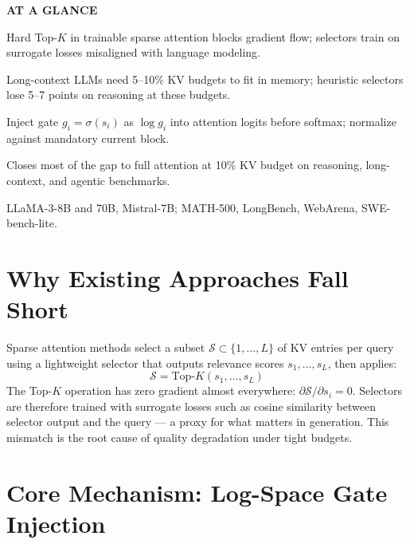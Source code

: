 \documentclass[10pt,twocolumn]{article}
\begin{document}
\begin{mdframed}[backgroundcolor=boxgray,linecolor=rulered,linewidth=1pt,
    innerleftmargin=6pt,innerrightmargin=6pt,
    innertopmargin=6pt,innerbottommargin=6pt]
\textbf{\small AT A GLANCE}\par\vspace{4pt}
\begin{description}[leftmargin=0pt,labelsep=4pt,itemsep=2pt,parsep=0pt,
    font=\small\bfseries]
  \item[Problem:] Hard Top-$K$ in trainable sparse attention blocks
    gradient flow; selectors train on surrogate losses misaligned
    with language modeling.
  \item[Why it matters:] Long-context LLMs need 5--10\% KV budgets
    to fit in memory; heuristic selectors lose 5--7 points on
    reasoning at these budgets.
  \item[Method:] Inject gate $g_i = \sigma(s_i)$ as $\log g_i$ into
    attention logits before softmax; normalize against mandatory
    current block.
  \item[Result:] Closes most of the gap to full attention at 10\%
    KV budget on reasoning, long-context, and agentic benchmarks.
  \item[Evidence:] LLaMA-3-8B and 70B, Mistral-7B; MATH-500,
    LongBench, WebArena, SWE-bench-lite.
\end{description}
\end{mdframed}

\section{Why Existing Approaches Fall Short}

Sparse attention methods select a subset $\mathcal{S} \subset
\{1,\ldots,L\}$ of KV entries per query using a lightweight selector
that outputs relevance scores $s_1,\ldots,s_L$, then applies:
\[
  \mathcal{S} = \mathrm{Top}\text{-}K(s_1,\ldots,s_L)
\]
The Top-$K$ operation has zero gradient almost everywhere:
$\partial\mathcal{S}/\partial s_i = 0$. Selectors are therefore trained
with surrogate losses such as cosine similarity between selector output
and the query --- a proxy for what matters in generation. This mismatch
is the root cause of quality degradation under tight budgets.

\section{Core Mechanism: Log-Space Gate Injection}
\end{document}
